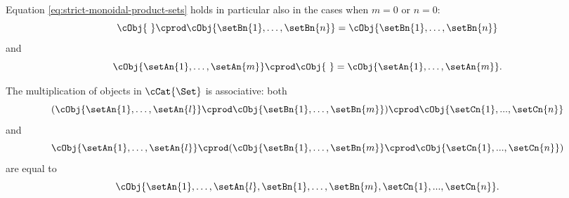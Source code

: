 Equation \cref{eq:strict-monoidal-product-sets} holds in particular also in the cases when $m = 0$ or $n =0$:
\begin{equation}
    \cObj{ \ } \cprod \cObj{\setBn{1}, \dots, \setBn{n}} = \cObj{\setBn{1},  \dots, \setBn{n}}
\end{equation}
and
\begin{equation}
    \cObj{\setAn{1}, \dots, \setAn{m}} \cprod \cObj{ \ } = \cObj{\setAn{1}, \dots, \setAn{m}}.
\end{equation}


\begin{remark}
The multiplication of objects in $\cCat{\Set}$ is associative: both
\begin{equation}
( \cObj{\setAn{1}, \dots, \setAn{l}} \cprod \cObj{\setBn{1}, \dots, \setBn{m}}) \cprod \cObj{\setCn{1}, ..., \setCn{n}}
\end{equation}
and
\begin{equation}
\cObj{\setAn{1}, \dots, \setAn{l}} \cprod (\cObj{\setBn{1}, \dots, \setBn{m}} \cprod \cObj{\setCn{1}, ..., \setCn{n}})
\end{equation}
are equal to
\begin{equation}
\cObj{\setAn{1}, \dots, \setAn{l}, \setBn{1}, \dots, \setBn{m}, \setCn{1}, ..., \setCn{n}}.
\end{equation}
\end{remark}
